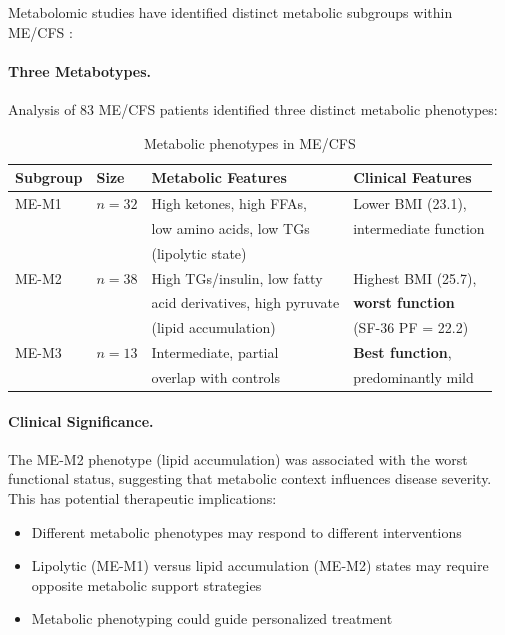 Metabolomic studies have identified distinct metabolic subgroups within ME/CFS \cite{Germain2020metabolic}:

\paragraph{Three Metabotypes.}
Analysis of 83 ME/CFS patients identified three distinct metabolic phenotypes:

\begin{table}[htbp]
\centering
\caption{Metabolic phenotypes in ME/CFS}
\label{tab:metabotypes}
\begin{tabular}{llll}
\toprule
\textbf{Subgroup} & \textbf{Size} & \textbf{Metabolic Features} & \textbf{Clinical Features} \\
\midrule
ME-M1 & $n=32$ & High ketones, high FFAs, & Lower BMI (23.1), \\
      &        & low amino acids, low TGs & intermediate function \\
      &        & (lipolytic state) & \\
\addlinespace
ME-M2 & $n=38$ & High TGs/insulin, low fatty & Highest BMI (25.7), \\
      &        & acid derivatives, high pyruvate & \textbf{worst function} \\
      &        & (lipid accumulation) & (SF-36 PF = 22.2) \\
\addlinespace
ME-M3 & $n=13$ & Intermediate, partial & \textbf{Best function}, \\
      &        & overlap with controls & predominantly mild \\
\bottomrule
\end{tabular}
\end{table}

\paragraph{Clinical Significance.}
The ME-M2 phenotype (lipid accumulation) was associated with the worst functional status, suggesting that metabolic context influences disease severity. This has potential therapeutic implications:
\begin{itemize}
    \item Different metabolic phenotypes may respond to different interventions
    \item Lipolytic (ME-M1) versus lipid accumulation (ME-M2) states may require opposite metabolic support strategies
    \item Metabolic phenotyping could guide personalized treatment
\end{itemize}

